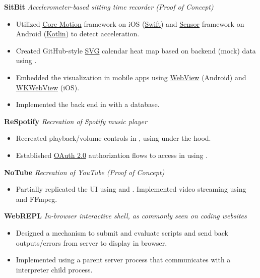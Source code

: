 \documentclass[11pt]{article}
\begin{document}
\textbf{SitBit} \enspace \textit{Accelerometer-based sitting time recorder (Proof of Concept) } 
\begin{itemize}[leftmargin=15pt, noitemsep, topsep=0pt]
\item Utilized \underline{Core Motion} framework on iOS (\underline{Swift}) and \underline{Sensor} framework on Android (\underline{Kotlin}) to detect acceleration.
\item Created GitHub-style \underline{SVG} calendar heat map based on backend (mock) data  using \underline{}.
\item Embedded the visualization in mobile apps using \underline{WebView} (Android) and \underline{WKWebView} (iOS). 
\item Implemented the back end in \underline{} with a \underline{} database.
\end{itemize}
\vspace{0.5em}
%
\textbf{ReSpotify} \enspace \textit{Recreation of Spotify music player}
\begin{itemize}[leftmargin=15pt, noitemsep, topsep=0pt]
\item  Recreated playback/volume controls in  \underline{}, using \underline{} under the hood.
\item Established \underline{OAuth 2.0} authorization flows to access \underline{} in \underline{} using \underline{}.
\end{itemize}
\vspace{0.5em}
%
\textbf{NoTube} \enspace \textit{Recreation of YouTube (Proof of Concept)}
\begin{itemize}[leftmargin=15pt, noitemsep, topsep=0pt]
\item Partially replicated the UI using \underline{} and \underline{}. Implemented video streaming using \underline{} and FFmpeg.
\end{itemize}
\vspace{0.5em}
%
\textbf{WebREPL}  \enspace \textit{In-browser interactive shell, as commonly seen on coding websites}
\begin{itemize}[leftmargin=15pt, noitemsep, topsep=0pt]
\item Designed a mechanism to submit and evaluate scripts and send back outputs/errors from server  to display in browser.
\item Implemented using a parent \underline{} server process that communicates with a \underline{} interpreter child process.
\end{itemize}
\end{document}
